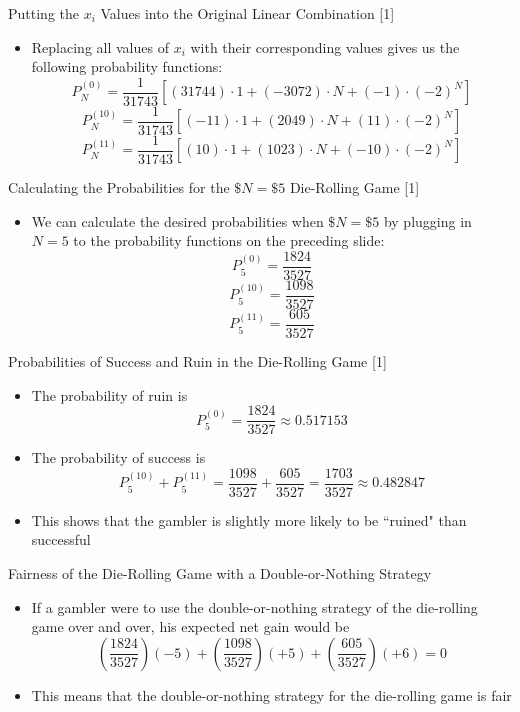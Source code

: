 \documentclass[14pt]{beamer}
\begin{document}
\begin{frame}{Putting the $x_i$ Values into the Original Linear Combination [1]}
 \begin{itemize}
    \item Replacing all values of $x_i$ with their corresponding values gives us the following probability functions:
    $$P^{(0)}_N 
        = \frac{1}{31743}[(31744) \cdot 1 + (-3072) \cdot N + (-1) \cdot (-2)^N]$$
    $$P^{(10)}_N 
        = \frac{1}{31743}[(-11) \cdot 1 + (2049) \cdot N + (11) \cdot (-2)^N]$$
    $$P^{(11)}_N 
        = \frac{1}{31743}[(10) \cdot 1 + (1023) \cdot N + (-10) \cdot (-2)^N]$$
 \end{itemize}
\end{frame}

\begin{frame}{Calculating the Probabilities for the $\$N=\$5$ Die-Rolling Game [1]}
 \begin{itemize}
     \item We can calculate the desired probabilities when $\$N=\$5$ by plugging in $N=5$ to the probability functions on the preceding slide:
     $$P^{(0)}_{5} = \frac{1824}{3527}$$
$$P^{(10)}_{5} = \frac{1098}{3527}$$
$$P^{(11)}_{5} = \frac{605}{3527}$$
 \end{itemize}  
\end{frame}

\begin{frame}{Probabilities of Success and Ruin in the Die-Rolling Game [1]}
 \begin{itemize}
     \item The probability of ruin is
     $$P^{(0)}_{5} = \frac{1824}{3527} \approx 0.517153$$ 
     \item The probability of success is
     $$P^{(10)}_{5} + P^{(11)}_{5} = \frac{1098}{3527} + \frac{605}{3527} = \frac{1703}{3527} \approx 0.482847$$
     \item This shows that the gambler is slightly more likely to be ``ruined" than successful
 \end{itemize}
\end{frame}

\begin{frame}{Fairness of the Die-Rolling Game with a Double-or-Nothing Strategy}
 \begin{itemize}
     \item If a gambler were to use the double-or-nothing strategy of the die-rolling game over and over, his expected net gain would be
     $$ \left( \frac{1824}{3527} \right)(-5) + \left( \frac{1098}{3527} \right)(+5) + \left( \frac{605}{3527} \right)(+6) = 0$$
     \item This means that the double-or-nothing strategy for the die-rolling game is fair
 \end{itemize}
\end{frame}
\end{document}
